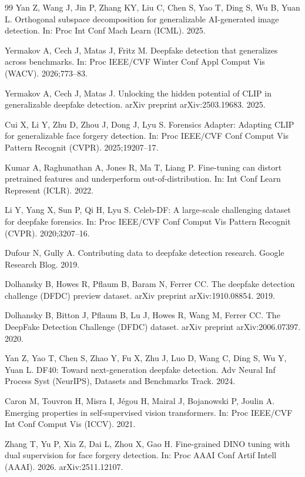 \documentclass[fonts]{icst}
\begin{document}
\begin{thebibliography}{99}
Yan Z, Wang J, Jin P, Zhang KY, Liu C, Chen S, Yao T, Ding S, Wu B, Yuan L.
Orthogonal subspace decomposition for generalizable AI-generated image detection.
In: Proc Int Conf Mach Learn (ICML). 2025.

Yermakov A, Cech J, Matas J, Fritz M.
Deepfake detection that generalizes across benchmarks.
In: Proc IEEE/CVF Winter Conf Appl Comput Vis (WACV). 2026;773--83.

Yermakov A, Cech J, Matas J.
Unlocking the hidden potential of CLIP in generalizable deepfake detection.
arXiv preprint arXiv:2503.19683. 2025.

Cui X, Li Y, Zhu D, Zhou J, Dong J, Lyu S.
Forensics Adapter: Adapting CLIP for generalizable face forgery detection.
In: Proc IEEE/CVF Conf Comput Vis Pattern Recognit (CVPR). 2025;19207--17.

Kumar A, Raghunathan A, Jones R, Ma T, Liang P.
Fine-tuning can distort pretrained features and underperform out-of-distribution.
In: Int Conf Learn Represent (ICLR). 2022.

Li Y, Yang X, Sun P, Qi H, Lyu S.
Celeb-DF: A large-scale challenging dataset for deepfake forensics.
In: Proc IEEE/CVF Conf Comput Vis Pattern Recognit (CVPR). 2020;3207--16.

Dufour N, Gully A.
Contributing data to deepfake detection research.
Google Research Blog. 2019.

Dolhansky B, Howes R, Pflaum B, Baram N, Ferrer CC.
The deepfake detection challenge (DFDC) preview dataset.
arXiv preprint arXiv:1910.08854. 2019.

Dolhansky B, Bitton J, Pflaum B, Lu J, Howes R, Wang M, Ferrer CC.
The DeepFake Detection Challenge (DFDC) dataset.
arXiv preprint arXiv:2006.07397. 2020.

Yan Z, Yao T, Chen S, Zhao Y, Fu X, Zhu J, Luo D, Wang C, Ding S, Wu Y, Yuan L.
DF40: Toward next-generation deepfake detection.
Adv Neural Inf Process Syst (NeurIPS), Datasets and Benchmarks Track. 2024.

Caron M, Touvron H, Misra I, J{\'e}gou H, Mairal J, Bojanowski P, Joulin A.
Emerging properties in self-supervised vision transformers.
In: Proc IEEE/CVF Int Conf Comput Vis (ICCV). 2021.

Zhang T, Yu P, Xia Z, Dai L, Zhou X, Gao H.
Fine-grained DINO tuning with dual supervision for face forgery detection.
In: Proc AAAI Conf Artif Intell (AAAI). 2026. arXiv:2511.12107.


\end{thebibliography}
\end{document}
